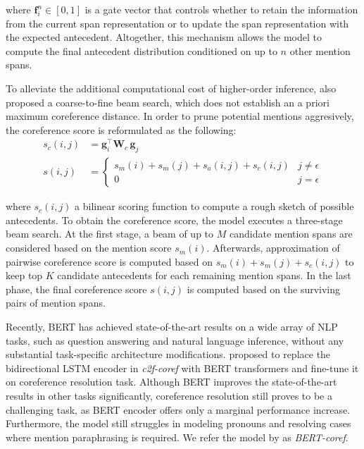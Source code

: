 \documentclass[11pt]{article}
\begin{document}
where $\pmb{f}_{i}^{n} \in [0,1]$ is a gate vector that controls whether to retain the information from the current span representation or to update the span representation with the expected antecedent. Altogether, this mechanism allows the model to compute the final antecedent distribution conditioned on up to $n$ other mention spans. 

To alleviate the additional computational cost of higher-order inference, \parencite{lee2018higher} also proposed a coarse-to-fine beam search, which does not establish an a priori maximum coreference distance. In order to prune potential mentions aggresively, the coreference score is reformulated as the following:
\begin{align}
s_{c}(i, j) &= \pmb{g}_{i}^{\top}\textbf{W}_{c}\, \pmb{g}_{j}\\
s(i, j) &= \begin{cases}
s_{m}(i) + s_{m}(j) + s_{a}(i, j) + s_{c}(i, j) & j \neq \epsilon \\
0 & j = \epsilon
\end{cases}
\end{align}

where $s_{c}(i, j)$ a bilinear scoring function to compute a rough sketch of possible antecedents. To obtain the coreference score, the model executes a three-stage beam search. At the first stage, a beam of up to $M$ candidate mention spans are considered based on the mention score $s_{m}(i)$. Afterwards,  approximation of pairwise coreference score is computed based on $s_{m}(i) + s_{m}(j) + s_{c}(i, j)$ to keep top $K$ candidate antecedents for each remaining mention spans. In the last phase, the final coreference score $s(i, j)$ is computed based on the surviving pairs of mention spans.

Recently, BERT \parencite{devlin2019bert} has achieved state-of-the-art results on a wide array of NLP tasks, such as question answering and natural language inference, without any substantial task-specific architecture modifications. \parencite{joshi2019coref} proposed to replace the bidirectional LSTM encoder in \textit{c2f-coref} with BERT transformers and fine-tune it on coreference resolution task. Although BERT improves the state-of-the-art results in other tasks significantly, coreference resolution still proves to be a challenging task, as BERT encoder offers only a marginal performance increase. Furthermore, the model still struggles in modeling pronouns and resolving cases where mention paraphrasing is required. We refer the model by \parencite{joshi2019coref} as \textit{BERT-coref}.
\end{document}
